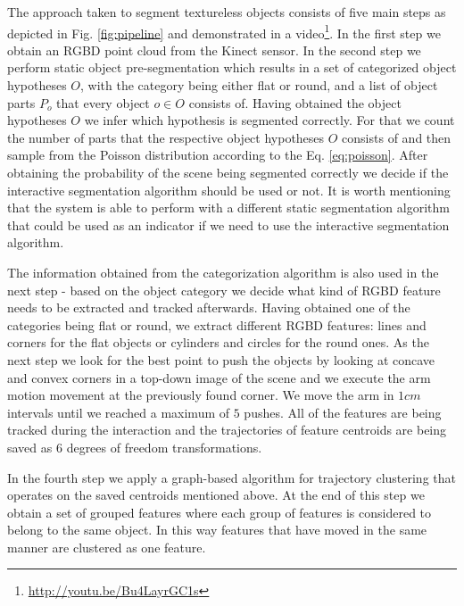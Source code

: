  The approach taken to segment textureless objects   
 consists of five main steps as depicted in Fig. \ref{fig:pipeline}
  and demonstrated in a video\footnote{\url{http://youtu.be/Bu4LayrGC1s}}.
 In the first step we obtain an RGBD point cloud from the Kinect sensor. In the second step we perform static object
 pre-segmentation which results in a set of categorized object hypotheses $O$,
 with the category being either flat or round, and a list of object parts $P_{o}$ that every object 
 $o \in O$ consists of. Having obtained the object hypotheses $O$ we infer which hypothesis
 is segmented  correctly. For
 that we count the  number of parts that the respective object hypotheses $O$ 
 consists of and then sample from the Poisson distribution according to the Eq. \ref{eq:poisson}.
 After obtaining the probability of the scene being segmented correctly we 
decide if the interactive segmentation algorithm should be used or not. It is worth mentioning that the system is able to perform with a different static segmentation algorithm that could be used as an indicator if we need to use the interactive segmentation algorithm.



 The information obtained from the categorization algorithm is also used in the next step - based on the object category we decide what kind of RGBD feature needs to be extracted and tracked afterwards. Having obtained one of the categories being flat or round, we extract different RGBD features: lines and corners for the flat objects or cylinders and circles for the round ones. As the next step we look for the best point to push the objects by looking at concave and convex corners in a top-down image of the scene and we execute the arm motion movement at the previously found corner. We move the arm in $1cm$ intervals until we reached a maximum of $5$ 
  pushes. All of the features are being tracked during the interaction 
 and the trajectories of feature centroids  are being  saved as 6 degrees of freedom transformations. 
 
  
In the fourth step we apply a graph-based algorithm for trajectory clustering that operates on the saved centroids mentioned above. At the end of this step we obtain a set of grouped features where each group of features is considered to belong to the same object. In this way features that have moved in the same manner are clustered as one feature. 


